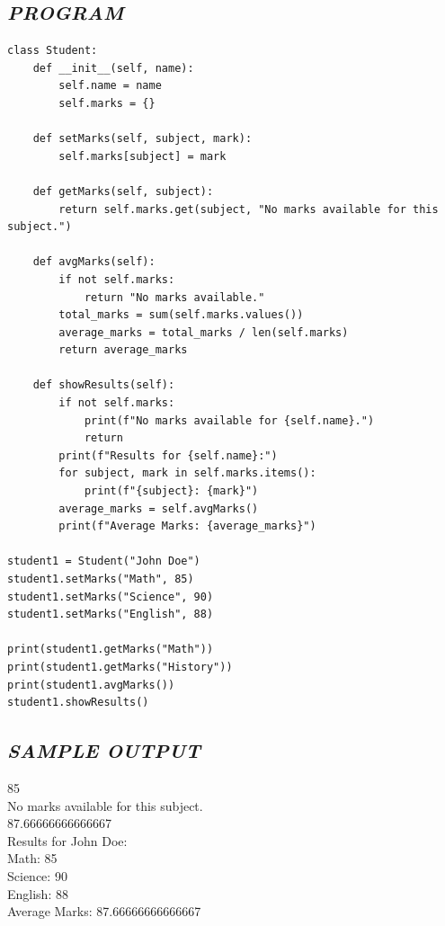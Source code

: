 \documentclass[11pt,a4paper]{article}
\begin{document}
\subsection*{\textit{PROGRAM}}
\begin{lstlisting}[style=pythonstyle]
class Student: 
    def __init__(self, name): 
        self.name = name 
        self.marks = {} 
 
    def setMarks(self, subject, mark): 
        self.marks[subject] = mark 
 
    def getMarks(self, subject): 
        return self.marks.get(subject, "No marks available for this subject.") 
 
    def avgMarks(self): 
        if not self.marks: 
            return "No marks available." 
        total_marks = sum(self.marks.values()) 
        average_marks = total_marks / len(self.marks) 
        return average_marks 
 
    def showResults(self): 
        if not self.marks: 
            print(f"No marks available for {self.name}.") 
            return 
        print(f"Results for {self.name}:") 
        for subject, mark in self.marks.items(): 
            print(f"{subject}: {mark}") 
        average_marks = self.avgMarks() 
        print(f"Average Marks: {average_marks}") 

student1 = Student("John Doe") 
student1.setMarks("Math", 85) 
student1.setMarks("Science", 90) 
student1.setMarks("English", 88) 

print(student1.getMarks("Math")) 
print(student1.getMarks("History")) 
print(student1.avgMarks()) 
student1.showResults()
\end{lstlisting}

\subsection*{\textit{SAMPLE OUTPUT}}
\begin{tcolorbox}[colback=black!85,colframe=navyblue,title=\textbf{Terminal Output},coltitle=white,fonttitle=\bfseries\small]
\small\ttfamily\color{green!30!white}
85\\
No marks available for this subject.\\
87.66666666666667\\
Results for John Doe:\\
Math: 85\\
Science: 90\\
English: 88\\
Average Marks: 87.66666666666667
\end{tcolorbox}
\end{document}

